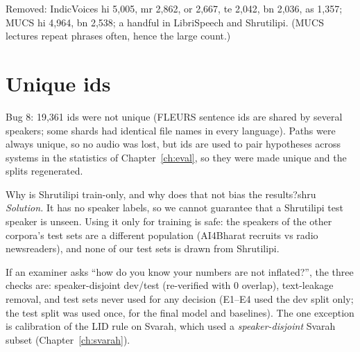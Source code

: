 Removed: IndicVoices hi 5{,}005, mr 2{,}862, or 2{,}667, te 2{,}042, bn 2{,}036, as 1{,}357; MUCS hi 4{,}964, bn 2{,}538; a handful in
LibriSpeech and Shrutilipi. (MUCS lectures repeat phrases often, hence the large count.)

\begin{center}
\end{center}

\section{Unique ids}

Bug 8: 19{,}361 ids were not unique (FLEURS sentence ids are shared by several speakers; some shards had identical file names in
every language). Paths were always unique, so no audio was lost, but ids are used to pair hypotheses across systems in the
statistics of Chapter~\ref{ch:eval}, so they were made unique and the splits regenerated.

\begin{exercise}{Why is Shrutilipi train-only, and why does that not bias the results?}{shru}
\textit{Solution.} It has no speaker labels, so we cannot guarantee that a Shrutilipi test speaker is unseen. Using it only for
training is safe: the speakers of the other corpora's test sets are a different population (AI4Bharat recruits vs radio
newsreaders), and none of our test sets is drawn from Shrutilipi.
\end{exercise}

\begin{vivatip}
If an examiner asks ``how do you know your numbers are not inflated?'', the three checks are: speaker-disjoint dev/test (re-verified
with 0 overlap), text-leakage removal, and test sets never used for any decision (E1--E4 used the dev split only; the test split was
used once, for the final model and baselines). The one exception is calibration of the LID rule on Svarah, which used a
\emph{speaker-disjoint} Svarah subset (Chapter~\ref{ch:svarah}).
\end{vivatip}
